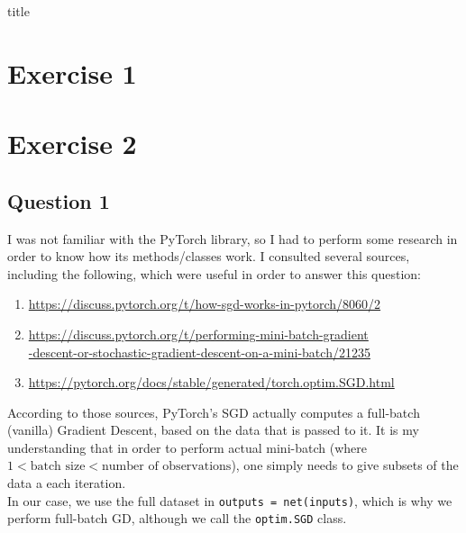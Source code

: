 \documentclass[12pt]{article}
\begin{document}
{title}

\tableofcontents
\listoffigures




\section{Exercise 1}
\section{Exercise 2}
\subsection{Question 1}
I was not familiar with the PyTorch library, so I had to perform some research in order to know how its methods/classes work.
I consulted several sources, including the following, which were useful in order to answer this question:
\begin{enumerate}
    \item \href{https://discuss.pytorch.org/t/how-sgd-works-in-pytorch/8060/2}{https://discuss.pytorch.org/t/how-sgd-works-in-pytorch/8060/2}
    \item \href{https://discuss.pytorch.org/t/performing-mini-batch-gradient-descent-or-stochastic-gradient-descent-on-a-mini-batch/21235}{https://discuss.pytorch.org/t/performing-mini-batch-gradient} \\
          \href{https://discuss.pytorch.org/t/performing-mini-batch-gradient-descent-or-stochastic-gradient-descent-on-a-mini-batch/21235}{-descent-or-stochastic-gradient-descent-on-a-mini-batch/21235}

    \item \href{https://pytorch.org/docs/stable/generated/torch.optim.SGD.html}{https://pytorch.org/docs/stable/generated/torch.optim.SGD.html}
\end{enumerate}
According to those sources, PyTorch's SGD actually computes a full-batch (vanilla) Gradient Descent, based on the data that is passed to it.
It is my understanding that in order to perform actual mini-batch (\ie where $1 < \text{batch size} < \text{number of observations}$), one simply needs to give subsets of the data a each iteration. \\
In our case, we use the full dataset in \texttt{outputs = net(inputs)}, which is why we perform full-batch GD, although we call the \texttt{optim.SGD} class.
\end{document}

